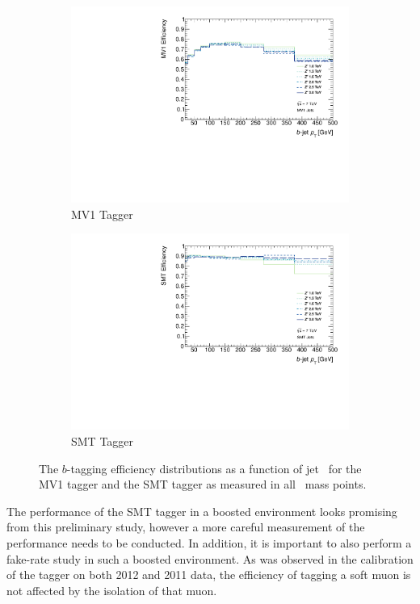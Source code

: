 \begin{figure}[tbhp]
  \centering
  \begin{subfigure}[b]{0.75\textwidth}
    \includegraphics[width=\textwidth]{PartBoosted/Plots/he_mv1_jet_pt.pdf}
    \caption{MV1 Tagger}\label{fig:BoostedBTaggMV1}
  \end{subfigure}
  
  \begin{subfigure}[b]{0.75\textwidth}
    \includegraphics[width=\textwidth]{PartBoosted/Plots/he_smt_jet_pt.pdf}
    \caption{SMT Tagger}\label{fig:BoostedBTaggSMT}
  \end{subfigure}
  \caption{The $b$-tagging efficiency distributions as a function of jet \pt\ for the MV1 tagger and the SMT tagger as measured in all \Zprime\ mass points.}\label{fig:BoostedBTaggEffs}
\end{figure}

The performance of the SMT tagger in a boosted environment looks promising from this preliminary study, however a more careful measurement of the performance needs to be conducted. In addition, it is important to also perform a fake-rate study in such a boosted environment. As was observed in the calibration of the tagger on both 2012 and 2011 data, the efficiency of tagging a soft muon is not affected by the isolation of that muon.
